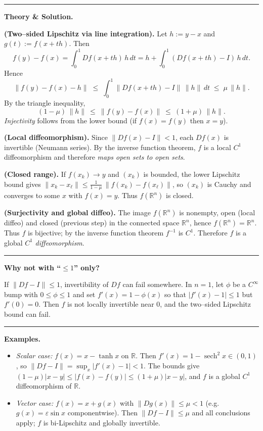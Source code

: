 \documentclass[12pt,a4paper]{article}
\theoremstyle{plain}
\theoremstyle{definition}
\theoremstyle{remark}
\theoremstyle{remark}
\newcommand{\gap}{\vspace{6pt}}
\begin{document}
\bigskip\hrule\bigskip

\textbf{Theory \& Solution.}\gap

\textbf{(Two–sided Lipschitz via line integration).}\;
Let $h:=y-x$ and $g(t):=f(x+th)$. Then
\[
f(y)-f(x)=\int_{0}^{1} Df(x+th)\,h\,dt
= h + \int_{0}^{1} (Df(x+th)-I)\,h\,dt.
\]
Hence
\[
\|f(y)-f(x)-h\|
\;\le\; \int_{0}^{1} \|Df(x+th)-I\|\,\|h\|\,dt
\;\le\; \mu\,\|h\|.
\]
By the triangle inequality,
\[
(1-\mu)\,\|h\|\ \le\ \|f(y)-f(x)\|\ \le\ (1+\mu)\,\|h\|.
\]
\emph{Injectivity} follows from the lower bound (if $f(x)=f(y)$ then $x=y$).

\medskip

\textbf{(Local diffeomorphism).}\;
Since $\|Df(x)-I\|<1$, each $Df(x)$ is invertible (Neumann series).
By the inverse function theorem, $f$ is a local $C^1$ diffeomorphism and therefore
\emph{maps open sets to open sets}.

\medskip

\textbf{(Closed range).}\;
If $f(x_k)\to y$ and $(x_k)$ is bounded, the lower Lipschitz bound gives
$\|x_k-x_\ell\|\le \tfrac{1}{1-\mu}\,\|f(x_k)-f(x_\ell)\|$, so $(x_k)$ is Cauchy
and converges to some $x$ with $f(x)=y$. Thus $f(\mathbb{R}^n)$ is closed.

\medskip

\textbf{(Surjectivity and global diffeo).}\;
The image $f(\mathbb{R}^n)$ is nonempty, open (local diffeo) and closed (previous step)
in the connected space $\mathbb{R}^n$, hence $f(\mathbb{R}^n)=\mathbb{R}^n$.
Thus $f$ is bijective; by the inverse function theorem $f^{-1}$ is $C^1$.
Therefore $f$ is a global $C^1$ \emph{diffeomorphism}.

\bigskip\hrule\bigskip

\textbf{Why not with “$\le 1$” only?}\gap

If $\|Df-I\|\le 1$, invertibility of $Df$ can fail somewhere.
In $n=1$, let $\phi$ be a $C^\infty$ bump with $0\le \phi \le 1$ and set
$f'(x)=1-\phi(x)$ so that $|f'(x)-1|\le 1$ but $f'(0)=0$.
Then $f$ is not locally invertible near $0$, and the two–sided Lipschitz bound can fail.

\bigskip\hrule\bigskip

\textbf{Examples.}\gap

\begin{itemize}\setlength{\itemsep}{6pt}
	\item \emph{Scalar case:} $f(x)=x-\tanh x$ on $\mathbb{R}$.
	Then $f'(x)=1-\operatorname{sech}^2 x\in(0,1)$, so $\|Df-I\|=\sup_x|f'(x)-1|<1$.
	The bounds give $(1-\mu)|x-y|\le|f(x)-f(y)|\le(1+\mu)|x-y|$,
	and $f$ is a global $C^1$ diffeomorphism of $\mathbb{R}$.
	
	\item \emph{Vector case:} $f(x)=x+g(x)$ with $\|Dg(x)\|\le \mu<1$ (e.g.\ $g(x)=\varepsilon\sin x$ componentwise).
	Then $\|Df-I\|\le\mu$ and all conclusions apply; $f$ is bi-Lipschitz and globally invertible.
\end{itemize}
\end{document}
